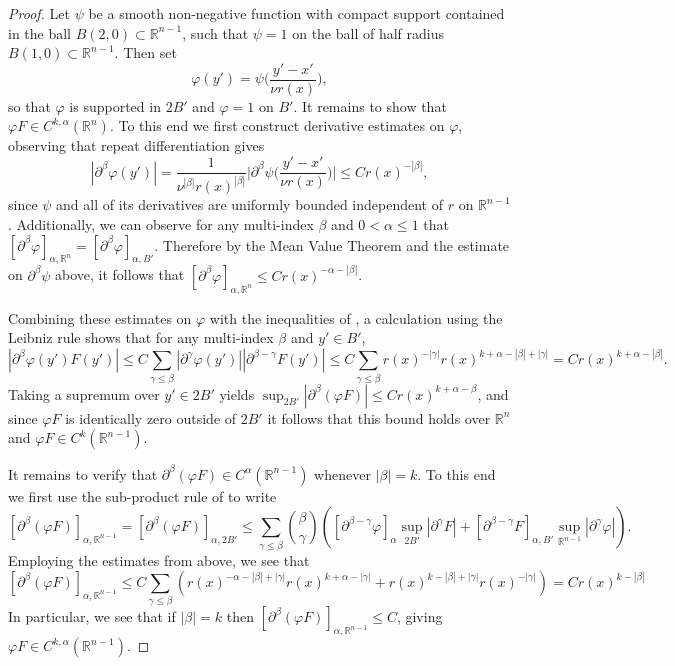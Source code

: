 \documentclass[oneside,hidelinks,indentfirst,10pt]{book}
\begin{document}
\begin{proof}
Let \(\psi\) be a smooth non-negative function with compact support contained in the ball \(B(2,0)\subset\mathbb{R}^{n-1}\), such that \(\psi=1\) on the ball of half radius \(B(1,0)\subset\mathbb{R}^{n-1}\). Then set
\[
    \varphi(y')=\psi\bigg(\frac{y'-x'}{\nu r(x)}\bigg),
\]
so that \(\varphi\) is supported in \(2B'\) and \(\varphi=1\) on \(B'\). It remains to show that \(\varphi F\in C^{k,\alpha}(\mathbb{R}^n)\). To this end we first construct derivative estimates on \(\varphi\), observing that repeat differentiation gives
\[
    |\partial^\beta\varphi(y')|=\frac{1}{\nu^{|\beta|}r(x)^{|\beta|}}\bigg|\partial^\beta\psi\bigg(\frac{y'-x'}{\nu r(x)}\bigg)\bigg|\leq Cr(x)^{-|\beta|},
\]
since \(\psi\) and all of its derivatives are uniformly bounded independent of \(r\) on \(\mathbb{R}^{n-1}\). Additionally, we can observe for any multi-index \(\beta\) and \(0<\alpha\leq 1\) that \([\partial^\beta\varphi]_{\alpha,\mathbb{R}^n}=[\partial^\beta\varphi]_{\alpha,B'}\). Therefore by the Mean Value Theorem and the estimate on \(\partial^\beta\psi\) above, it follows that \([\partial^\beta\varphi]_{\alpha,\mathbb{R}^n}\leq Cr(x)^{-\alpha-|\beta|}\).


Combining these estimates on \(\varphi\) with the inequalities of , a calculation using the Leibniz rule shows that for any multi-index \(\beta\) and \(y'\in B'\),
\[
    |\partial^\beta\varphi(y') F(y')|\leq C\sum_{\gamma\leq\beta}|\partial^\gamma\varphi (y')||\partial^{\beta-\gamma}F(y')|\leq C\sum_{\gamma\leq\beta}r(x)^{-|\gamma|}r(x)^{k+\alpha-|\beta|+|\gamma|}=Cr(x)^{k+\alpha-|\beta|}.
\]
Taking a supremum over \(y'\in 2B'\) yields \(\sup_{2B'}|\partial^\beta(\varphi F)|\leq Cr(x)^{k+\alpha-\beta}\), and since \(\varphi F\) is identically zero outside of \(2B'\) it follows that this bound holds over \(\mathbb{R}^n\) and \(\varphi F\in C^{k}(\mathbb{R}^{n-1})\). 

It remains to verify that \(\partial^\beta(\varphi F)\in C^{\alpha}(\mathbb{R}^{n-1})\) whenever \(|\beta|=k\). To this end we first use the sub-product rule of  to write
\[
    [\partial^\beta(\varphi F)]_{\alpha,\mathbb{R}^{n-1}}=[\partial^\beta(\varphi F)]_{\alpha,2B'}\leq\sum_{\gamma\leq\beta}\binom{\beta}{\gamma}([\partial^{\beta-\gamma}\varphi]_{\alpha}\sup_{2B'}|\partial^\gamma F|+[\partial^{\beta-\gamma}F]_{\alpha,B'}\sup_{\mathbb{R}^{n-1}}|\partial^\gamma \varphi|).
\]
Employing the estimates from above, we see that
\[
    [\partial^\beta(\varphi F)]_{\alpha,\mathbb{R}^{n-1}}\leq C\sum_{\gamma\leq\beta}(r(x)^{-\alpha -|\beta|+|\gamma|}r(x)^{k+\alpha-|\gamma|}+r(x)^{k-|\beta|+|\gamma|}r(x)^{-|\gamma|})=Cr(x)^{k-|\beta|}
\]
In particular, we see that if \(|\beta|=k\) then \([\partial^\beta(\varphi F)]_{\alpha,\mathbb{R}^{n-1}}\leq C\), giving \(\varphi F\in C^{k,\alpha}(\mathbb{R}^{n-1})\).
\end{proof}
\end{document}
